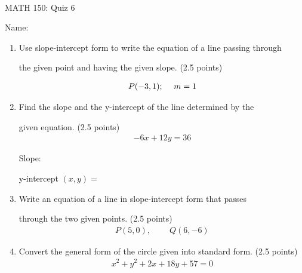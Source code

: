 \documentclass[11pt]{article}
\newcommand{\vs}{\vspace{0.2in}}
\begin{document}
\tt
\centerline{MATH 150: Quiz 6}
\vs

Name: \underline{\hspace{5cm}}

\medskip

\begin{enumerate}

\item
Use slope-intercept form to write the equation of a line passing through

the given point and having the given slope.
(2.5 points)

\begin{align*}
P(-3, 1)
\text{;}\hspace{0.5cm}
m = 1
\end{align*}





\vspace{2.7in}

\item
Find the slope and the y-intercept of the line determined by the

given equation. (2.5 points)
\begin{align*}
 -6x + 12y = 36
\end{align*}
\vspace{4cm}

Slope: \underline{\hspace{3cm}}
\vs

y-intercept $(x, y) = $
\underline{\hspace{3cm}}


\newpage

\item
Write an equation of a line in slope-intercept form that passes

through the two given points. (2.5 points)
\begin{align*}
 P(5, 0)
 \text{,} \hspace{1cm}
 Q(6, -6)
\end{align*}



\vspace{3in}

\item
Convert the general form of the circle given into standard form. (2.5 points)
\begin{align*}
 x^2 + y^2 + 2x + 18y + 57 = 0
\end{align*}


\end{enumerate}
\end{document}
